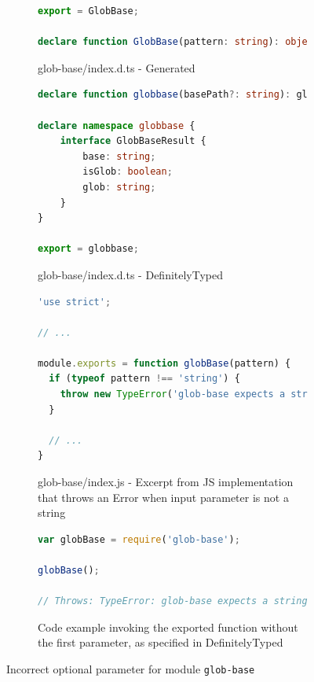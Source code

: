 \documentclass[english,cleveref,autoref,submission]{programming}
\begin{document}
\begin{figure}[tp]
    \centering
    \begin{subfigure}[t]{0.48\linewidth}
      \begin{lstlisting}[language=TypeScript,numbers=none]
export = GlobBase;

declare function GlobBase(pattern: string): object;
      \end{lstlisting}
      \caption{glob-base/index.d.ts - Generated}
    \end{subfigure}
    \hfill
    \begin{subfigure}[t]{0.48\linewidth}
      \begin{lstlisting}[language=TypeScript,numbers=none]
declare function globbase(basePath?: string): globbase.GlobBaseResult;

declare namespace globbase {
    interface GlobBaseResult {
        base: string;
        isGlob: boolean;
        glob: string;
    }
}

export = globbase;
      \end{lstlisting}
      \caption{glob-base/index.d.ts - DefinitelyTyped}
    \end{subfigure}

    \begin{subfigure}[t]{0.48\linewidth}
      \begin{lstlisting}[language=TypeScript,numbers=none]
'use strict';

// ...

module.exports = function globBase(pattern) {
  if (typeof pattern !== 'string') {
    throw new TypeError('glob-base expects a string.');
  }

  // ...
} 
      \end{lstlisting}
      \caption{glob-base/index.js - Excerpt from JS implementation
        that throws an Error when input parameter is not a string} 
      \label{fig:subfloat-globbase-js-implementation}
    \end{subfigure}
    \hfill
    \begin{subfigure}[t]{0.48\linewidth}
      \begin{lstlisting}[language=JavaScript,numbers=none]
var globBase = require('glob-base');

globBase();

// Throws: TypeError: glob-base expects a string.
      \end{lstlisting}
      \caption{Code example invoking the exported function without the first parameter, as specified in DefinitelyTyped}
    \end{subfigure}

    \caption{Incorrect optional parameter for module \texttt{glob-base}}
    \label{fig:experiments-results-module-glob-base}
\end{figure}
\end{document}
